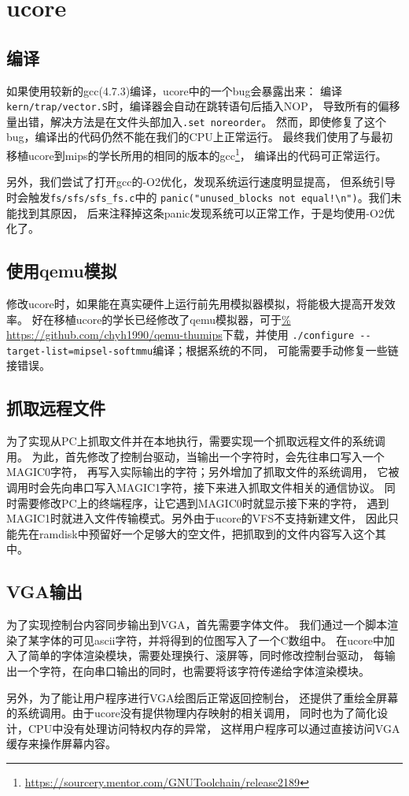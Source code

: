 
\section{ucore}
\subsection{编译}
如果使用较新的gcc(4.7.3)编译，ucore中的一个bug会暴露出来：
编译\verb|kern/trap/vector.S|时，编译器会自动在跳转语句后插入NOP，
导致所有的偏移量出错，解决方法是在文件头部加入\verb|.set noreorder|。
然而，即使修复了这个bug，编译出的代码仍然不能在我们的CPU上正常运行。
最终我们使用了与最初移植ucore到mips的学长所用的相同的版本的gcc\footnote{%
\url{https://sourcery.mentor.com/GNUToolchain/release2189}}，
编译出的代码可正常运行。

另外，我们尝试了打开gcc的-O2优化，发现系统运行速度明显提高，
但系统引导时会触发\verb|fs/sfs/sfs_fs.c|中的
\verb|panic("unused_blocks not equal!\n")|。我们未能找到其原因，
后来注释掉这条panic发现系统可以正常工作，于是均使用-O2优化了。


\subsection{使用qemu模拟}
修改ucore时，如果能在真实硬件上运行前先用模拟器模拟，将能极大提高开发效率。
好在移植ucore的学长已经修改了qemu模拟器，可于\url{%
https://github.com/chyh1990/qemu-thumips}下载，并使用
\verb|./configure --target-list=mipsel-softmmu|编译；根据系统的不同，
可能需要手动修复一些链接错误。


\subsection{抓取远程文件}
为了实现从PC上抓取文件并在本地执行，需要实现一个抓取远程文件的系统调用。
为此，首先修改了控制台驱动，当输出一个字符时，会先往串口写入一个MAGIC0字符，
再写入实际输出的字符；另外增加了抓取文件的系统调用，
它被调用时会先向串口写入MAGIC1字符，接下来进入抓取文件相关的通信协议。
同时需要修改PC上的终端程序，让它遇到MAGIC0时就显示接下来的字符，
遇到MAGIC1时就进入文件传输模式。另外由于ucore的VFS不支持新建文件，
因此只能先在ramdisk中预留好一个足够大的空文件，把抓取到的文件内容写入这个其中。


\subsection{VGA输出}
为了实现控制台内容同步输出到VGA，首先需要字体文件。
我们通过一个脚本渲染了某字体的可见ascii字符，并将得到的位图写入了一个C数组中。
在ucore中加入了简单的字体渲染模块，需要处理换行、滚屏等，同时修改控制台驱动，
每输出一个字符，在向串口输出的同时，也需要将该字符传递给字体渲染模块。

另外，为了能让用户程序进行VGA绘图后正常返回控制台，
还提供了重绘全屏幕的系统调用。由于ucore没有提供物理内存映射的相关调用，
同时也为了简化设计，CPU中没有处理访问特权内存的异常，
这样用户程序可以通过直接访问VGA缓存来操作屏幕内容。



